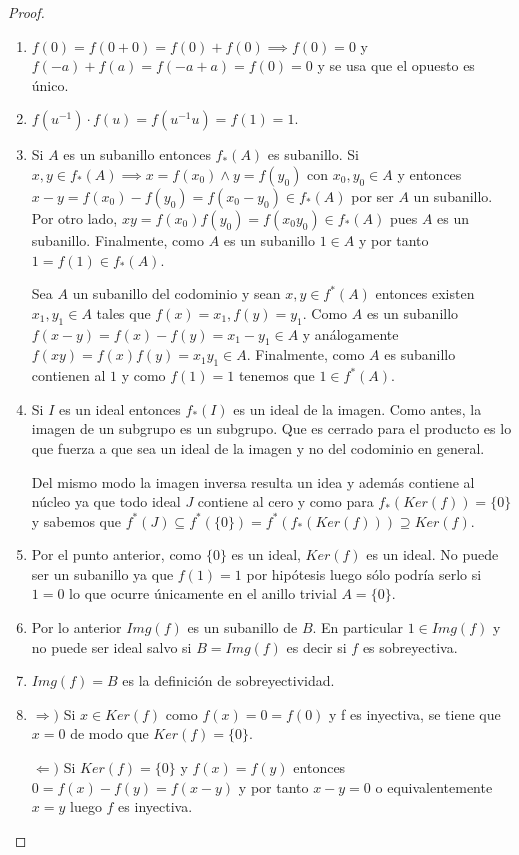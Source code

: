 \begin{proof}
	\begin{enumerate}
	\item $f(0) = f(0+0) = f(0) + f(0) \implies f(0) = 0$ y $f(-a) + f(a) = f(-a+a) = f(0) = 0$ y se usa que el opuesto es único. 
	\item $f(u^{-1}) \cdot f(u) = f(u^{-1}u) = f(1) = 1$. 
	\item Si $A$ es un subanillo entonces $f_*(A)$ es subanillo. Si $x,y \in f_*(A) \implies x = f(x_0) \land y = f(y_0)$ con $x_0,y_0 \in A$ y entonces $x-y = f(x_0) - f(y_0) = f(x_0-y_0) \in f_*(A)$ por ser $A$ un subanillo. Por otro lado, $xy = f(x_0)f(y_0) = f(x_0y_0) \in f_*(A)$ pues $A$ es un subanillo. Finalmente, como $A$ es un subanillo $1 \in A$ y por tanto $1 = f(1) \in f_*(A)$. 
	
	Sea $A$ un subanillo del codominio y sean $x,y \in f^*(A)$ entonces existen $x_1,y_1 \in A$ tales que $f(x) = x_1,f(y) = y_1$. Como $A$ es un subanillo $f(x-y) = f(x) - f(y) = x_1 - y_1 \in A$ y análogamente $f(xy) = f(x)f(y) = x_1y_1 \in A$. Finalmente, como $A$ es subanillo contienen al $1$ y como $f(1) = 1$ tenemos que $1 \in f^*(A)$. 
	
	\item Si $I$ es un ideal entonces $f_*(I)$ es un ideal de la imagen. Como antes, la imagen de un subgrupo es un subgrupo. Que es cerrado para el producto es lo que fuerza a que sea un ideal de la imagen y no del codominio en general. 
	
	Del mismo modo la imagen inversa resulta un idea y además contiene al núcleo ya que todo ideal $J$ contiene al cero y como para $f_*(Ker(f)) = \{0\}$ y sabemos que $f^*(J) \subseteq f^*(\{0\}) = f^*(f_*(Ker(f))) \supseteq  Ker(f)$. 
	
	\item Por el punto anterior, como $\{0\}$ es un ideal, $Ker(f)$ es un ideal. No puede ser un subanillo ya que $f(1) = 1$ por hipótesis luego sólo podría serlo si $1 = 0$ lo que ocurre únicamente en el anillo trivial $A = \{0\}$. 
	
	\item Por lo anterior $Img(f)$ es un subanillo de $B$. En particular $1 \in Img(f)$ y no puede ser ideal salvo si $B = Img(f)$ es decir si $f$ es sobreyectiva. 
	
	\item $Img(f) = B$ es la definición de sobreyectividad. 
		
	\item  $\Rightarrow)$ Si $x \in Ker(f)$ como $f(x) = 0 = f(0)$ y f es inyectiva, se tiene que $x = 0$ de modo que $Ker(f) = \{0\}$. 
		
	$\Leftarrow)$ Si $Ker(f) = \{0\}$ y $f(x) = f(y)$ entonces $0 = f(x) - f(y) = f(x-y)$ y por tanto $x-y = 0$ o equivalentemente $x = y$ luego $f$ es inyectiva. 
	\end{enumerate}
\end{proof}


